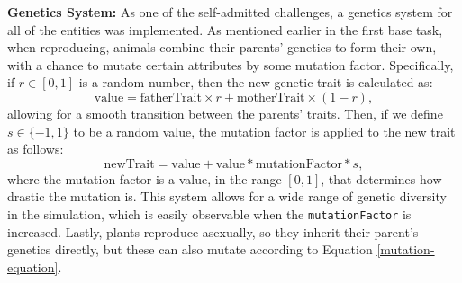 \documentclass[10pt, a4paper]{scrartcl}
\begin{document}
\begin{multicols}{2}
    \noindent \textbf{Genetics System:} As one of the self-admitted challenges, a genetics system for all of the entities
    was implemented. As mentioned earlier in the first base task, when reproducing, animals combine their parents' genetics
    to form their own, with a chance to mutate certain attributes by some mutation factor. Specifically, if \( r \in [0, 1] \)
    is a random number, then the new genetic trait is calculated as:
    \begin{equation}
      \text{value} = \text{fatherTrait} \times r + \text{motherTrait} \times (1 - r), \nonumber
    \end{equation}
    allowing for a smooth transition between the parents' traits. Then, if we define \( s \in \{-1, 1\} \) to be a random
    value, the mutation factor is applied to the new trait as follows:
    \begin{equation}
      \label{mutation-equation}
      \text{newTrait} = \text{value} + \text{value} * \text{mutationFactor} * s,
    \end{equation}
    where the mutation factor is a value, in the range \( [0, 1] \), that determines how drastic the mutation is.
    This system allows for a wide range of genetic diversity in the simulation, which is easily observable when
    the \verb|mutationFactor| is increased. Lastly, plants reproduce asexually, so they inherit their parent's genetics
    directly, but these can also mutate according to Equation \ref{mutation-equation}.


\end{multicols}
\end{document}
